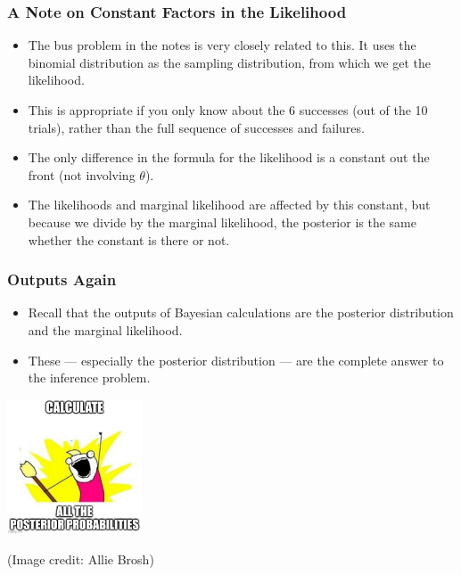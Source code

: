 \documentclass{beamer}
\begin{document}
\begin{frame}
\frametitle{A Note on Constant Factors in the Likelihood}

\begin{itemize}
\item The bus problem in the notes is very closely related to
this. It uses the binomial distribution as the sampling distribution, from
which we get the likelihood.\pause
\item This is appropriate if you only know about the 6
successes (out of the 10 trials), rather than the full
sequence of successes and failures.\pause
\item The only difference in the formula for the
likelihood is a constant out the front (not involving $\theta$).\pause
\item The likelihoods and marginal likelihood are affected by this constant,
but because we divide by the marginal likelihood, the posterior is the same
whether the constant is there or not.
\end{itemize}

\end{frame}


\begin{frame}
\frametitle{Outputs Again}

\begin{itemize}
\item Recall that the outputs of Bayesian calculations are the posterior distribution
and the marginal likelihood.\pause
\item These --- especially the posterior distribution --- are the complete
answer to the inference problem.
\end{itemize}

\centering
\includegraphics[width=0.3\textwidth]{images/brosh.jpg}

{\tiny (Image credit: Allie Brosh)}

\end{frame}
\end{document}
